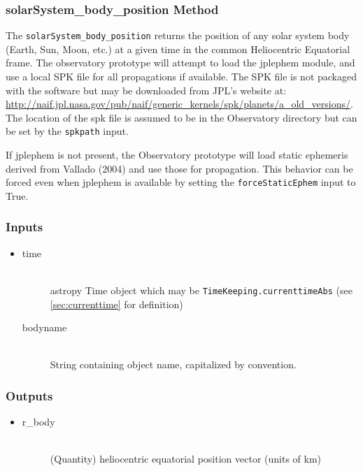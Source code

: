 \documentclass[cleanfoot]{asme2ej}
\begin{document}
\subsubsection{solarSystem\_body\_position Method}\label{sec:ssbPosTask}
The \verb+solarSystem_body_position+ returns the position of any solar system body (Earth, Sun, Moon, etc.) at a given time in the common Heliocentric Equatorial frame.  The observatory prototype will attempt to load the jplephem module, and use a local SPK file for all propagations if available.  The SPK file is not packaged with the software but may be downloaded from JPL's website at: \url{http://naif.jpl.nasa.gov/pub/naif/generic_kernels/spk/planets/a_old_versions/}.  The location of the spk file is assumed to be in the Observatory directory but can be set by the \verb+spkpath+ input.  

If jplephem is not present, the Observatory prototype will load static ephemeris derived from Vallado (2004) and use those for propagation.  This behavior can be forced even when jplephem is available by setting the \verb+forceStaticEphem+ input to True.

\subsubsection*{Inputs}
\begin{itemize}
    \item
    \begin{description}
        \item[time] \hfill \\
        astropy Time object which may be \verb+TimeKeeping.currenttimeAbs+ (see \ref{sec:currenttime} for definition)
        \item[bodyname] \hfill \\
        String containing object name, capitalized by convention.
    \end{description}
\end{itemize}

\subsubsection*{Outputs}
\begin{itemize}
    \item
    \begin{description}
        \item[r\_body] \hfill \\
        (Quantity) heliocentric equatorial position vector (units of km)
    \end{description}
\end{itemize}
\end{document}
